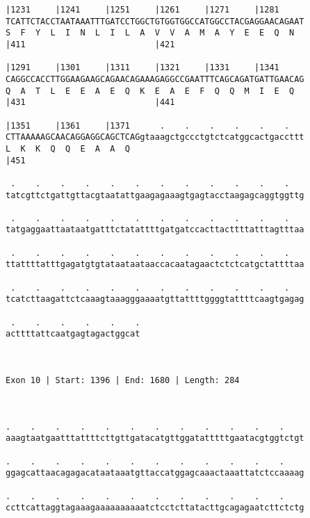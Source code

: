 \documentclass{article}
\begin{document}
\begin{Verbatim}
|1231     |1241     |1251     |1261     |1271     |1281     
TCATTCTACCTAATAAATTTGATCCTGGCTGTGGTGGCCATGGCCTACGAGGAACAGAAT
S  F  Y  L  I  N  L  I  L  A  V  V  A  M  A  Y  E  E  Q  N  
|411                          |421                          
  
|1291     |1301     |1311     |1321     |1331     |1341     
CAGGCCACCTTGGAAGAAGCAGAACAGAAAGAGGCCGAATTTCAGCAGATGATTGAACAG
Q  A  T  L  E  E  A  E  Q  K  E  A  E  F  Q  Q  M  I  E  Q  
|431                          |441                          
  
|1351     |1361     |1371      .    .    .    .    .    .   
CTTAAAAAGCAACAGGAGGCAGCTCAGgtaaagctgccctgtctcatggcactgaccttt
L  K  K  Q  Q  E  A  A  Q                                   
|451                                                        
  
 .    .    .    .    .    .    .    .    .    .    .    .   
tatcgttctgattgttacgtaatattgaagagaaagtgagtacctaagagcaggtggttg
                                                            
 .    .    .    .    .    .    .    .    .    .    .    .   
tatgaggaattaataatgatttctatattttgatgatccacttacttttatttagtttaa
                                                            
 .    .    .    .    .    .    .    .    .    .    .    .   
ttattttatttgagatgtgtataataataaccacaatagaactctctcatgctattttaa
                                                            
 .    .    .    .    .    .    .    .    .    .    .    .   
tcatcttaagattctcaaagtaaagggaaaatgttattttggggtattttcaagtgagag
                                                            
 .    .    .    .    .    .
acttttattcaatgagtagactggcat
                           
                           
 
Exon 10 | Start: 1396 | End: 1680 | Length: 284



.    .    .    .    .    .    .    .    .    .    .    .    
aaagtaatgaatttattttcttgttgatacatgttggatatttttgaatacgtggtctgt
                                                            
.    .    .    .    .    .    .    .    .    .    .    .    
ggagcattaacagagacataataaatgttaccatggagcaaactaaattatctccaaaag
                                                            
.    .    .    .    .    .    .    .    .    .    .    .    
ccttcattaggtagaaagaaaaaaaaaatctcctcttatacttgcagagaatcttctctg
                                                            

\end{Verbatim}
\end{document}
